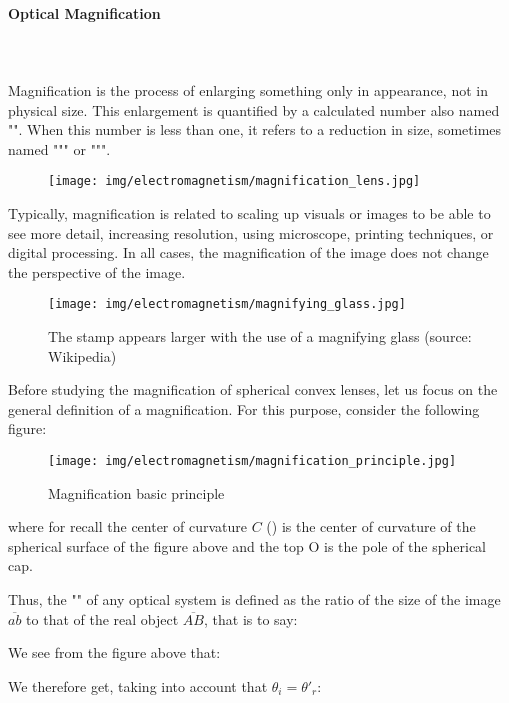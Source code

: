 	\paragraph{Optical Magnification}\mbox{}\\\\
	Magnification is the process of enlarging something only in appearance, not in physical size. This enlargement is quantified by a calculated number also named "". When this number is less than one, it refers to a reduction in size, sometimes named """ or """.
	\begin{figure}[H]
		\centering
		\texttt{[image: img/electromagnetism/magnification\_lens.jpg]}
	\end{figure}
	Typically, magnification is related to scaling up visuals or images to be able to see more detail, increasing resolution, using microscope, printing techniques, or digital processing. In all cases, the magnification of the image does not change the perspective of the image.
	\begin{figure}[H]
		\centering
		\texttt{[image: img/electromagnetism/magnifying\_glass.jpg]}
		\caption[]{The stamp appears larger with the use of a magnifying glass (source: Wikipedia)}
	\end{figure}
	Before studying the magnification of spherical convex lenses, let us focus on the general definition of a magnification. For this purpose, consider the following figure:
	\begin{figure}[H]
		\centering
		\texttt{[image: img/electromagnetism/magnification\_principle.jpg]}
		\caption[]{Magnification basic principle}
	\end{figure}
	where for recall the center of curvature $C$ () is the center of curvature of the spherical surface of the figure above and the top O is the pole of the spherical cap.

	Thus, the "" of any optical system is defined as the ratio of the size of the image $\overline{ab}$ to that of the real object $\overline{AB}$, that is to say:
	
	We see from the figure above that:
	
	We therefore get, taking into account that $\theta_i={\theta'}_r$:
	
